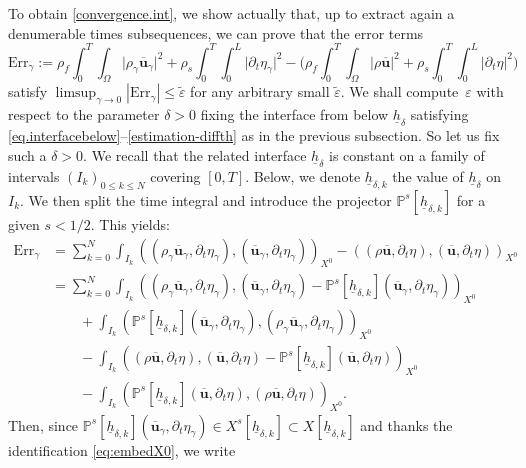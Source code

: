 \documentclass[JEP,XML,SOM,Unicode,NoFloatCountersInSection]{cedram}
\newcommand{\Err}{\mathrm{Err}}
\theoremstyle{remark}
\theoremstyle{definition}
\newcommand{\ug}{\boldsymbol{u}}
\let\CM\Omega
\newcommand{\hb}{{\underline{h}}}
\begin{document}
To obtain \eqref{convergence.int}, we show actually that, up to extract again a denumerable times subsequences, we can prove that the error terms
\[
\Err_{\gamma} := \rho_{f}\int_{0}^{T}\!\!\int_{\CM}\vert \rho_{\gamma}\overline{\ug}_{\gamma}\vert^{2}+\rho_{s}\int_{0}^{T}\!\!\int_{0}^{L}\vert\partial_{t}\eta_{\gamma}\vert^{2}
- \biggl( \rho_{f}\int_{0}^{T}\!\!\int_{\CM}\vert \rho\overline{\ug}\vert^{2}+\rho_{s}\int_{0}^{T}\!\!\int_{0}^{L}\vert\partial_{t}\eta\vert^{2} \biggr)
\]
satisfy $\limsup_{\gamma \to 0} |\Err_{\gamma}| \leq \tilde\varepsilon$ for any arbitrary small $\tilde\varepsilon$. We shall compute~$\varepsilon$ with respect to the parameter $\delta >0$ fixing the interface from below $\hb_{\delta}$ satisfying
\eqref{eq.interfacebelow}--\eqref{estimation-diffth} as in the previous subsection. So let us fix such a $\delta >0$.
We recall that the related interface $\hb_{\delta}$
is constant on a family of intervals $(I_k)_{0 \leq k \leq N}$ covering $[0,T]$. Below, we denote $\hb_{\delta,k}$ the value
of $\hb_{\delta}$ on $I_k$. We then split the time integral and introduce the projector $\mathbb P^s[\hb_{\delta,k}]$
for a given $s < 1/2$. This yields:
\begin{align*}
\Err_{\gamma} & = \sum_{k=0}^N \int_{I_{k}} ( (\rho_{\gamma} \overline{\ug}_{\gamma},\partial_t \eta_{\gamma}),( \overline{\ug}_{\gamma},\partial_t \eta_{\gamma}))_{X^0} - ( (\rho \overline{\ug},\partial_t \eta),( \overline{\ug},\partial_t \eta))_{X^0} \\
& = \sum_{k=0}^N \int_{I_{k}} ( (\rho_{\gamma} \overline{\ug}_{\gamma},\partial_t\eta_{\gamma}),( \overline{\ug}_{\gamma},\partial_t \eta_{\gamma})- \mathbb{P}^{s}[\hb_{\delta, k}](\overline{\ug}_{\gamma},\partial_{t}\eta_{\gamma}))_{X^0} \\
& \qquad + \int_{I_{k}} ( \mathbb{P}^{s}[\hb_{\delta, k}](\overline{\ug}_{\gamma},\partial_{t}\eta_{\gamma}),(\rho_{\gamma} \overline{\ug}_{\gamma},\partial_t \eta_{\gamma}))_{X^0} \\
& \qquad - \int_{I_{k}} ( (\rho \overline{\ug},\partial_t \eta),( \overline{\ug},\partial_t \eta)- \mathbb{P}^{s}[\hb_{\delta, k}](\overline{\ug},\partial_{t}\eta))_{X^0} \\
& \qquad - \int_{I_{k}} ( \mathbb{P}^{s}[\hb_{\delta, k}](\overline{\ug},\partial_{t}\eta),(\rho \overline{\ug},\partial_t \eta))_{X^0}.
\end{align*}
Then, since $\mathbb P^s[\hb_{\delta,k}](\overline{\ug}_\gamma,\partial_t \eta_\gamma) \in X^s[\hb_{\delta,k}]\subset X[\hb_{\delta,k}] $ and thanks the identification \eqref{eq:embedX0}, we write
\end{document}
